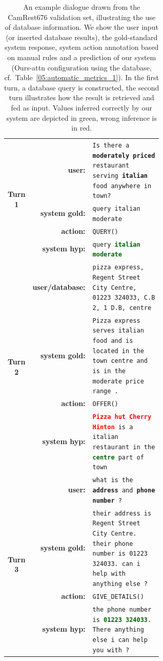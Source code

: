 \begin{table}[tp]
    \centering\scriptsize
    \begin{tabular}{crp{0.6\linewidth}}
        \toprule
         \multirow{4}{*}{\bf Turn 1}&\bf user:& \texttt{Is there a \textbf{moderately priced} restaurant serving \textbf{italian} food anywhere in town?} \\
         &\bf system gold: & \texttt{query italian moderate} \\
         &\bf action: & \texttt{QUERY()} \\
         &\bf system hyp: & \texttt{query \textbf{\textcolor{darkgreen}{italian moderate}}}  \\
         \midrule
        \multirow{4}{*}{\bf Turn 2}&\bf user/database:& \texttt{pizza express, Regent Street City Centre, 01223 324033, C.B 2, 1 D.B, centre}  \\
         &\bf system gold:& \texttt{Pizza express serves italian food and is located in the town centre and is in the moderate price range .} \\        
        &\bf action: & \texttt{OFFER()} \\
        &\bf system hyp:& \texttt{\textbf{\textcolor{red}{Pizza hut Cherry Hinton}} is a italian restaurant in the \textbf{\textcolor{darkgreen}{centre}} part of town} \\
         \midrule
        \multirow{4}{*}{\bf Turn 3}&\bf user:& \texttt{what is the \textbf{address} and \textbf{phone number} ?} \\
        &\bf system gold:& \texttt{their address is  Regent Street City Centre. their phone number is 01223 324033. can i help with anything else ?} \\
         &\bf action: & \texttt{GIVE\_DETAILS()} \\
        & \bf system hyp:& \texttt{the phone number is \textbf{\textcolor{darkgreen}{01223 324033}}. There anything else i can help you with ?} \\
        \bottomrule
    \end{tabular}
    \vspace{-2mm}
    \caption{An example dialogue drawn from the CamRest676 validation set, illustrating the use of database information. We show the user input (or inserted database results), the gold-standard system response, system action annotation based on manual rules and a prediction of our system (Ours-attn configuration using the database, cf.~Table~\ref{05:automatic_metrics_1}). In the first turn, a database query is constructed, the second turn illustrates how the result is retrieved and fed as input. Values inferred correctly by our system are depicted in green, wrong inference is in red.}
    \label{05:tab:example}
\end{table}

